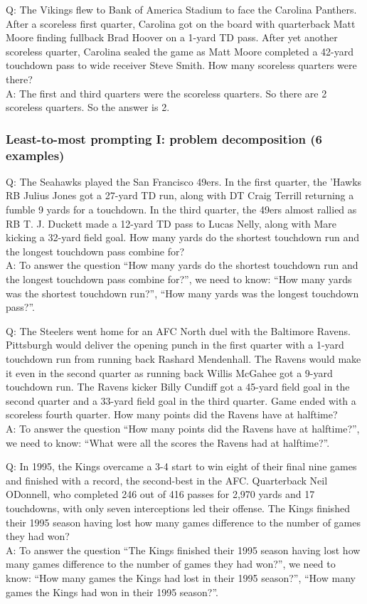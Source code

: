 Q: The Vikings flew to Bank of America Stadium to face the Carolina Panthers. After a scoreless first quarter, Carolina got on the board with quarterback Matt Moore finding fullback Brad Hoover on a 1-yard TD pass. After yet another scoreless quarter, Carolina sealed the game as Matt Moore completed a 42-yard touchdown pass to wide receiver Steve Smith. How many scoreless quarters were there?\\
A: The first and third quarters were the scoreless quarters. So there are 2 scoreless quarters. So the answer is 2.

\subsubsection{Least-to-most prompting I: problem decomposition (6 examples)}

Q: The Seahawks played the San Francisco 49ers. In the first quarter, the 'Hawks RB Julius Jones got a 27-yard TD run, along with DT Craig Terrill returning a fumble 9 yards for a touchdown. In the third quarter, the 49ers almost rallied as RB T. J. Duckett made a 12-yard TD pass to Lucas Nelly, along with Mare kicking a 32-yard field goal. How many yards do the shortest touchdown run and the longest touchdown pass combine for? \\
A: To answer the question ``How many yards do the shortest touchdown run and the longest touchdown pass combine for?'', we need to know: ``How many yards was the shortest touchdown run?'', ``How many yards was the longest touchdown pass?''.

Q: The Steelers went home for an AFC North duel with the Baltimore Ravens. Pittsburgh would deliver the opening punch in the first quarter with a 1-yard touchdown run from running back Rashard Mendenhall. The Ravens would make it even in the second quarter as running back Willis McGahee got a 9-yard touchdown run. The Ravens kicker Billy Cundiff got a 45-yard field goal in the second quarter and a 33-yard field goal in the third quarter. Game ended with a scoreless fourth quarter. How many points did the Ravens have at halftime? \\
A: To answer the question ``How many points did the Ravens have at halftime?'', we need to know: ``What were all the scores the Ravens had at halftime?''.

Q: In 1995, the Kings overcame a 3-4 start to win eight of their final nine games and finished with a record, the second-best in the AFC. Quarterback Neil ODonnell, who completed 246 out of 416 passes for 2,970 yards and 17 touchdowns, with only seven interceptions led their offense. The Kings finished their 1995 season having lost how many games difference to the number of games they had won? \\
A: To answer the question ``The Kings finished their 1995 season having lost how many games difference to the number of games they had won?'', we need to know: ``How many games the Kings had lost in their 1995 season?'', ``How many games the Kings had won in their 1995 season?''.

